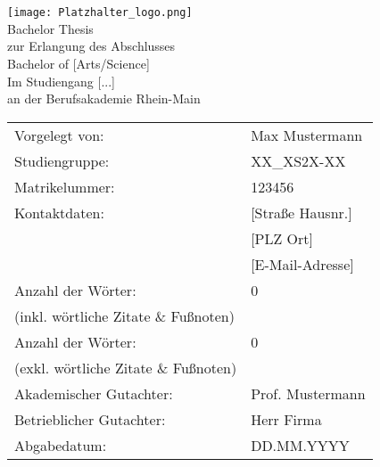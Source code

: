 \begin{center}
     \\
     \\[3ex]%
    \texttt{[image: Platzhalter\_logo.png]} \\[3ex]
    \large{Bachelor Thesis\\ [-10pt]
        zur Erlangung des Abschlusses\\ [-10pt]
        Bachelor of [Arts/Science]\\
        Im Studiengang [...]\\ [-10pt]
        an der Berufsakademie Rhein-Main
}
\end{center}

\renewcommand{\arraystretch}{2.2}%
\begin{table}[h]
    \setlength{\tabcolsep}{32pt}
    \begin{tabularx}{\textwidth}{l l}
        Vorgelegt von:                       & Max Mustermann   \\ [-15pt]
        Studiengruppe:                       & XX\_XS2X-XX      \\ [-15pt]
        Matrikelummer:                       & 123456           \\ [-15pt]
        Kontaktdaten:                        & [Straße Hausnr.] \\ [-15pt]
        ~                                    & [PLZ Ort]        \\ [-15pt]
        ~                                    & [E-Mail-Adresse] \\
        Anzahl der Wörter:                   & 0                \\ [-18pt]
        (inkl. wörtliche Zitate \& Fußnoten) & ~                \\
        Anzahl der Wörter:                   & 0                \\ [-18pt]
        (exkl. wörtliche Zitate \& Fußnoten) & ~                \\
        Akademischer Gutachter:              & Prof. Mustermann \\ [-15pt]
        Betrieblicher Gutachter:             & Herr Firma       \\
        Abgabedatum:                         & DD.MM.YYYY       \\
    \end{tabularx}
\end{table}
\renewcommand{\arraystretch}{2.2}